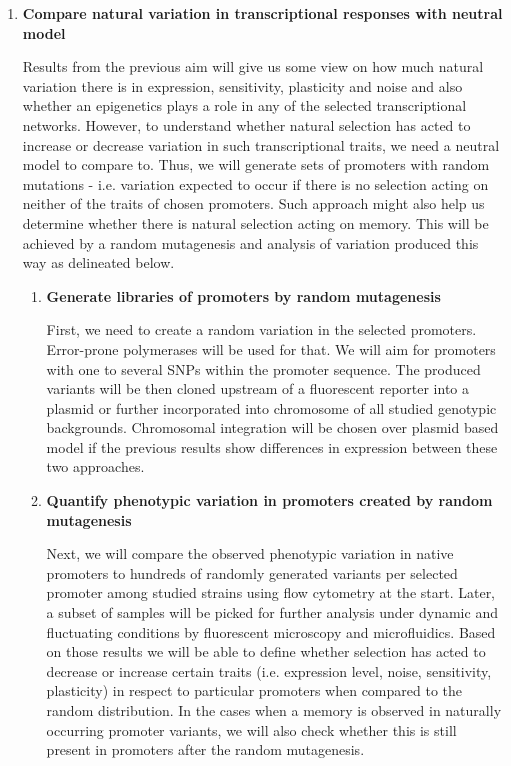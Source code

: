 \begin{enumerate}[font=\bfseries]
\begin{enumerate}[font=\bfseries]
	\end{enumerate}
	
	
	\item \textbf{Compare natural variation in transcriptional responses with neutral model}
	
	Results from the previous aim will give us some view on how much natural variation there is in expression, sensitivity, plasticity and noise and also whether an epigenetics plays a role in any of the selected transcriptional networks.
	However, to understand whether natural selection has acted to increase or decrease variation in such transcriptional traits, we need a neutral model to compare to.
	Thus, we will generate sets of promoters with random mutations - i.e. variation expected to occur if there is no selection acting on neither of the traits of chosen promoters.
	Such approach might also help us determine whether there is natural selection acting on memory.
	This will be achieved by a random mutagenesis and analysis of variation produced this way as delineated below.

	\begin{enumerate}[font=\bfseries]
	
		\item \textbf{Generate libraries of promoters by random mutagenesis}
		
		First, we need to create a random variation in the selected promoters.
		Error-prone polymerases will be used for that.
		We will aim for promoters with one to several SNPs within the promoter sequence.
		The produced variants will be then cloned upstream of a fluorescent reporter into a plasmid or further incorporated into chromosome of all studied genotypic backgrounds.
		Chromosomal integration will be chosen over plasmid based model if the previous results show differences in expression between these two approaches.


		\item \textbf{Quantify phenotypic variation in promoters created by random mutagenesis}
		
		Next, we will compare the observed phenotypic variation in native promoters to hundreds of randomly generated variants per selected promoter among studied strains using flow cytometry at the start.
		Later, a subset of samples will be picked for further analysis under dynamic and fluctuating conditions by fluorescent microscopy and microfluidics.
		Based on those results we will be able to define whether selection has acted to decrease or increase certain traits (i.e. expression level, noise, sensitivity, plasticity) in respect to particular promoters when compared to the random distribution.
		In the cases when a memory is observed in naturally occurring promoter variants, we will also check whether this is still present in promoters after the random mutagenesis.
	
	\end{enumerate}

\end{enumerate}

\cleardoublepage%

\shorthandon{-} 
